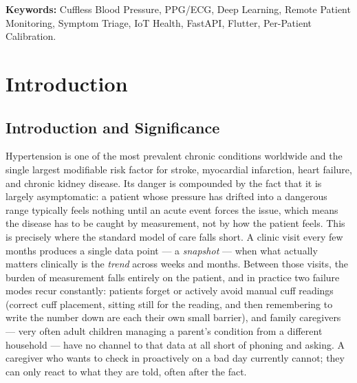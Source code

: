 \documentclass[12pt,a4paper]{report}
\begin{document}
\vspace{0.4cm}
\noindent\textbf{Keywords:} Cuffless Blood Pressure, PPG/ECG, Deep Learning,
Remote Patient Monitoring, Symptom Triage, IoT Health, FastAPI, Flutter,
Per-Patient Calibration.

\newpage
\tableofcontents
\listoffigures
\listoftables
\newpage
{}

\chapter{Introduction}

\section{Introduction and Significance}

Hypertension is one of the most prevalent chronic conditions worldwide and the
single largest modifiable risk factor for stroke, myocardial infarction, heart
failure, and chronic kidney disease. Its danger is compounded by the fact that
it is largely asymptomatic: a patient whose pressure has drifted into a
dangerous range typically feels nothing until an acute event forces the issue,
which means the disease has to be caught by measurement, not by how the
patient feels. This is precisely where the standard model of care falls short.
A clinic visit every few months produces a single data point --- a
\emph{snapshot} --- when what actually matters clinically is the \emph{trend}
across weeks and months. Between those visits, the burden of measurement falls
entirely on the patient, and in practice two failure modes recur constantly:
patients forget or actively avoid manual cuff readings (correct cuff placement,
sitting still for the reading, and then remembering to write the number down
are each their own small barrier), and family caregivers --- very often adult
children managing a parent's condition from a different household --- have no
channel to that data at all short of phoning and asking. A caregiver who wants
to check in proactively on a bad day currently cannot; they can only react to
what they are told, often after the fact.
\end{document}
